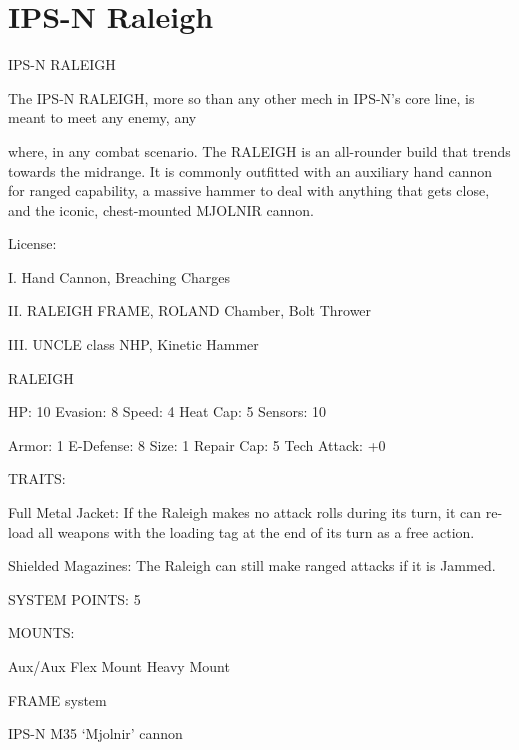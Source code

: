 \section{IPS-N Raleigh}

                                              IPS-N RALEIGH

The IPS-N RALEIGH, more so than any other mech in IPS-N’s core line, is meant to meet any enemy, any

where, in any combat scenario. The RALEIGH is an all-rounder build that trends towards the midrange. It is
commonly outfitted with an auxiliary hand cannon for ranged capability, a massive hammer to deal with
anything that gets close, and the iconic, chest-mounted MJOLNIR cannon.

                                                      License:

I. Hand Cannon, Breaching Charges

II. RALEIGH FRAME, ROLAND Chamber, Bolt Thrower

III. UNCLE class NHP, Kinetic Hammer





                                                    RALEIGH

  HP: 10          Evasion: 8                              Speed: 4            Heat Cap: 5         Sensors: 10

  Armor: 1        E-Defense: 8                            Size: 1             Repair Cap: 5       Tech Attack:
                                                                                                  +0

                                                      TRAITS:

  Full Metal Jacket: If the Raleigh makes no attack rolls during its turn, it can re-load all weapons with
  the loading tag at the end of its turn as a free action.

  Shielded Magazines: The Raleigh can still make ranged attacks if it is Jammed.

                                               SYSTEM POINTS: 5

                                                     MOUNTS:

  Aux/Aux                             Flex Mount                              Heavy Mount

                                                  FRAME system

                                           IPS-N M35 ‘Mjolnir’ cannon

